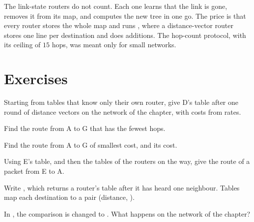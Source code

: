 The link-state routers do not count. Each one learns that the link is gone, removes it from its map, and computes the
new tree in one go. The price is that every router stores the whole map and runs , where a
distance-vector router stores one line per destination and does additions. The hop-count protocol, with its ceiling
of $15$ hops, was meant only for small networks.

\section{Exercises}\label{sec:g12:routing:exercises}

\begin{exercise}[$\star$]\label{exo:g12:routing:1}
Starting from tables that know only their own router, give D's table after one round of distance vectors on the
network of the chapter, with costs from rates.
\end{exercise}

\begin{exercise}[$\star$]\label{exo:g12:routing:2}
Find the route from A to G that has the fewest hops.
\end{exercise}

\begin{exercise}[$\star$]\label{exo:g12:routing:3}
Find the route from A to G of smallest cost, and its cost.
\end{exercise}

\begin{exercise}[$\star$]\label{exo:g12:routing:4}
Using E's table, and then the tables of the routers on the way, give the route of a packet from E to A.
\end{exercise}

\begin{exercise}[$\star$]\label{exo:g12:routing:5}
Write , which returns a router's table after it has heard
one neighbour. Tables map each destination to a pair (distance, ).
\end{exercise}

\begin{exercise}[$\star\star$]\label{exo:g12:routing:6}
In , the comparison \code{<} is changed to \code{>}. What happens on the network of the chapter?
\end{exercise}

